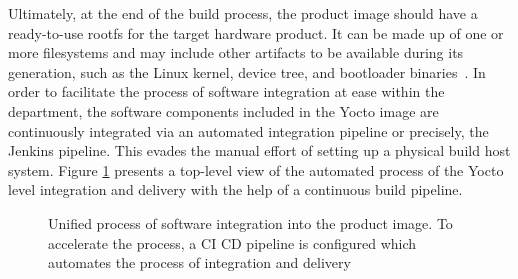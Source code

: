 Ultimately, at the end of the build process, the product image should have a ready-to-use rootfs for the target hardware product. It can be made up of one or more filesystems and may include other artifacts to be available during its generation, such as the Linux kernel, device tree, and bootloader binaries~\parencite{salvador2014embedded}. In order to facilitate the process of software integration at ease within the department, the software components included in the Yocto image are continuously integrated via an automated integration pipeline or precisely, the Jenkins pipeline. This evades the manual effort of setting up a physical build host system. Figure \ref{fig:softwareIntegrationAtProduct} presents a top-level view of the automated process of the Yocto level integration and delivery with the help of a continuous build pipeline.




\vspace{0.5cm}
\begin{figure}[H]
\caption[Software Integration at a product level]{Unified process of software integration into the product image. To accelerate the process, a \ac{CI} \ac{CD} pipeline is configured which automates the process of integration and delivery}\label{fig:softwareIntegrationAtProduct}
\end{figure}
\vspace{0.5cm}


